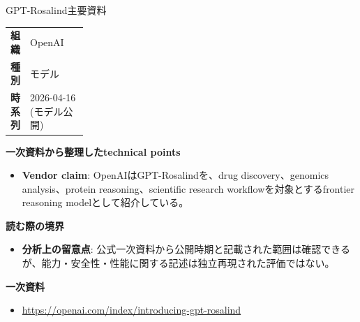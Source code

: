 \begin{technicalnote}{GPT-Rosalind}{主要資料}
\begingroup
\begin{tabularx}{\linewidth}{@{}>{\bfseries}p{0.22\linewidth}X@{}}
組織 & OpenAI \\
種別 & モデル \\
時系列 & 2026-04-16 (モデル公開) \\
\end{tabularx}
\smallskip
{\bfseries 一次資料から整理したtechnical points}
\begin{itemize}[leftmargin=1.5em,itemsep=0.35em]
\item \textbf{Vendor claim}: OpenAIはGPT-Rosalindを、drug discovery、genomics analysis、protein reasoning、scientific research workflowを対象とするfrontier reasoning modelとして紹介している。
\end{itemize}
{\bfseries 読む際の境界}
\begin{itemize}[leftmargin=1.5em,itemsep=0.35em]
\item \textbf{分析上の留意点}: 公式一次資料から公開時期と記載された範囲は確認できるが、能力・安全性・性能に関する記述は独立再現された評価ではない。
\end{itemize}
\begin{samepage}
{\bfseries 一次資料}
\begingroup\sloppy
\begin{itemize}[leftmargin=1.5em,itemsep=0.25em]
\item {\scriptsize\url{https://openai.com/index/introducing-gpt-rosalind}}
\end{itemize}
\endgroup
\end{samepage}
\endgroup
\end{technicalnote}
\medskip

